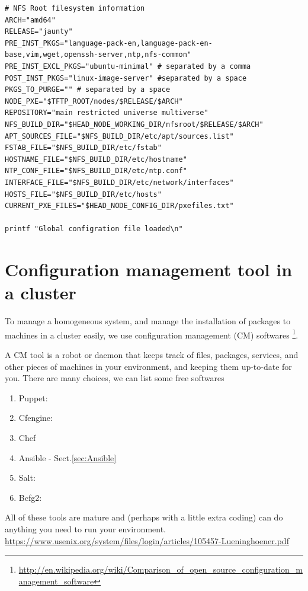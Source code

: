 \begin{enumerate}
\begin{verbatim}
# NFS Root filesystem information 
ARCH="amd64" 
RELEASE="jaunty" 
PRE_INST_PKGS="language-pack-en,language-pack-en-base,vim,wget,openssh-server,ntp,nfs-common" 
PRE_INST_EXCL_PKGS="ubuntu-minimal" # separated by a comma 
POST_INST_PKGS="linux-image-server" #separated by a space 
PKGS_TO_PURGE="" # separated by a space 
NODE_PXE="$TFTP_ROOT/nodes/$RELEASE/$ARCH" 
REPOSITORY="main restricted universe multiverse" 
NFS_BUILD_DIR="$HEAD_NODE_WORKING_DIR/nfsroot/$RELEASE/$ARCH" 
APT_SOURCES_FILE="$NFS_BUILD_DIR/etc/apt/sources.list" 
FSTAB_FILE="$NFS_BUILD_DIR/etc/fstab" 
HOSTNAME_FILE="$NFS_BUILD_DIR/etc/hostname" 
NTP_CONF_FILE="$NFS_BUILD_DIR/etc/ntp.conf" 
INTERFACE_FILE="$NFS_BUILD_DIR/etc/network/interfaces" 
HOSTS_FILE="$NFS_BUILD_DIR/etc/hosts" 
CURRENT_PXE_FILES="$HEAD_NODE_CONFIG_DIR/pxefiles.txt" 

printf "Global configration file loaded\n"
\end{verbatim}

\end{enumerate}


\section{Configuration management tool in a cluster}
\label{sec:package_management_software_in_cluster}
\label{sec:configuration-tool}
\label{sec:cluster-management-tool}

To manage a homogeneous system, and manage the installation of packages to
machines in a cluster easily, we use configuration management (CM) softwares
\footnote{\url{http://en.wikipedia.org/wiki/Comparison_of_open_source_configuration_management_software}}.

A CM tool is a robot or daemon that keeps track of files, packages, services,
and other pieces of machines in your environment, and keeping them up-to-date
for you. There are many choices, we can list some free softwares
\begin{enumerate}
  \item Puppet: 
  \item Cfengine:
  \item Chef
  \item Ansible - Sect.\ref{sec:Ansible}
  \item Salt:
  \item Bcfg2:
\end{enumerate}
All of these tools are mature and (perhaps with a little extra coding) can do
anything you need to run your environment.
\url{https://www.usenix.org/system/files/login/articles/105457-Lueninghoener.pdf}

